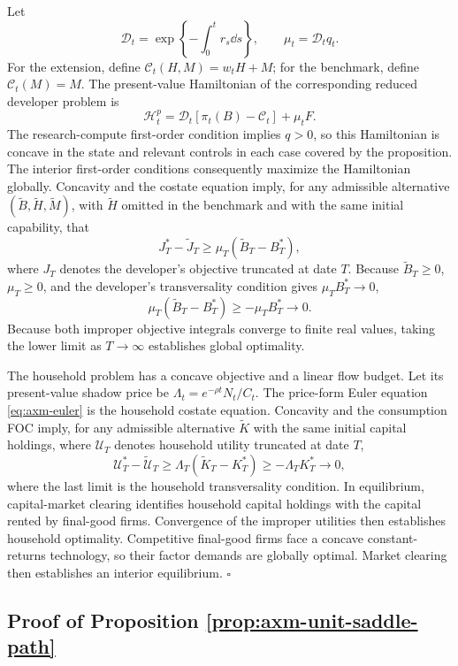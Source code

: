 Let
\[
 \mathcal D_t=\exp\left\{-\int_0^t r_s\dd s\right\},
 \qquad \mu_t=\mathcal D_tq_t.
\]
For the extension, define \(\mathcal C_t(H,M)=w_tH+M\); for the benchmark,
define \(\mathcal C_t(M)=M\). The present-value Hamiltonian of the corresponding
reduced developer problem is
\[
 \mathcal H_t^p
 =\mathcal D_t[\pi_t(B)-\mathcal C_t]+\mu_tF.
\]
The research-compute first-order condition implies \(q>0\), so this Hamiltonian
is concave in the state and relevant controls in each case covered by the
proposition. The interior first-order conditions consequently maximize the
Hamiltonian globally. Concavity and the costate equation imply, for any
admissible alternative \((\widetilde B,\widetilde H,\widetilde M)\), with
\(\widetilde H\) omitted in the benchmark and with the same initial capability,
that
\[
 J_T^*-\widetilde J_T
 \geq \mu_T(\widetilde B_T-B_T^*),
\]
where \(J_T\) denotes the developer's objective truncated at date \(T\).
Because \(\widetilde B_T\geq0\), \(\mu_T\geq0\), and the developer's
transversality condition gives \(\mu_TB_T^*\to0\),
\[
 \mu_T(\widetilde B_T-B_T^*)\geq-\mu_TB_T^*\to0.
\]
Because both improper objective integrals converge to finite real values,
taking the lower limit as \(T\to\infty\) establishes global optimality.

The household problem has a concave objective and a linear flow budget.
Let its present-value shadow price be
\(\Lambda_t=e^{-\rho t}N_t/C_t\). The price-form Euler equation
\eqref{eq:axm-euler} is the household costate equation. Concavity and the
consumption FOC imply, for any admissible alternative \(\widetilde K\) with the
same initial capital holdings, where \(\mathcal U_T\) denotes
household utility truncated at date \(T\),
\[
 \mathcal U_T^*-\widetilde{\mathcal U}_T
 \geq \Lambda_T(\widetilde K_T-K_T^*)
 \geq-\Lambda_TK_T^*\to0,
\]
where the last limit is the household transversality condition. In equilibrium,
capital-market clearing identifies household capital holdings with the capital
rented by final-good firms. Convergence of
the improper utilities then establishes household optimality. Competitive
final-good firms face a concave constant-returns technology, so their factor
demands are globally optimal. Market clearing then establishes an interior
equilibrium. \(\square\)

\subsection{Proof of Proposition \ref{prop:axm-unit-saddle-path}}


